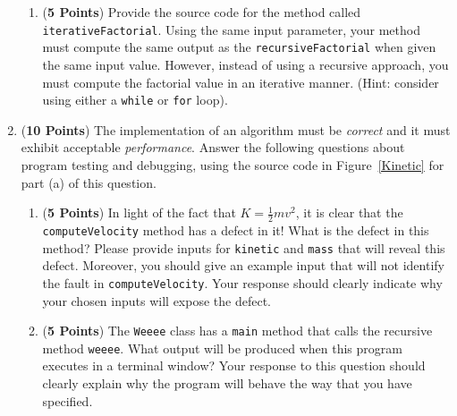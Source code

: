 \documentclass[12pt]{article}
\begin{document}
\begin{enumerate}
\begin{enumerate}
\item ({\bf 5 Points}) Provide the source code for the method called
  {\tt iterativeFactorial}.  Using the same input parameter, your
  method must compute the same output as the {\tt recursiveFactorial}
  when given the same input value.  However, instead of using a
  recursive approach, you must compute the factorial value in an
  iterative manner.  (Hint: consider using either a {\tt while} or
  {\tt for} loop).


\end{enumerate}

\newpage


\item ({\bf 10 Points}) The implementation of an algorithm must be
  {\em correct} and it must exhibit acceptable {\em performance}.
  Answer the following questions about program testing and debugging,
  using the source code in Figure~\ref{Kinetic} for part (a) of this
  question.

\begin{enumerate}
  
\item ({\bf 5 Points}) In light of the fact that $K =
  \frac{1}{2}mv^2$, it is clear that the {\tt computeVelocity} method
  has a defect in it!  What is the defect in this method?  Please
  provide inputs for {\tt kinetic} and {\tt mass} that will reveal
  this defect.  Moreover, you should give an example input that will
  not identify the fault in {\tt computeVelocity}.  Your response
  should clearly indicate why your chosen inputs will expose the
  defect.

\item ({\bf 5 Points}) The {\tt Weeee} class has a {\tt main} method
  that calls the recursive method {\tt weeee}.  What output will be
  produced when this program executes in a terminal window?  Your
  response to this question should clearly explain why the program
  will behave the way that you have specified.


\end{enumerate}
\end{enumerate}
\end{document}
